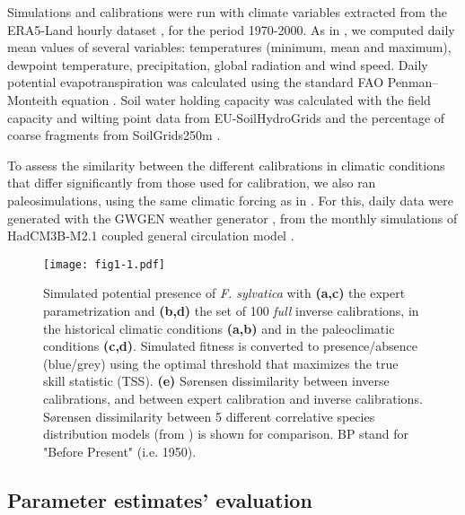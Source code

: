 \documentclass[preprint,12pt,authoryear]{elsarticle}
\begin{document}
Simulations and calibrations were run with climate variables extracted from the ERA5-Land hourly dataset \citep{MunozSabater2021}, for the period 1970-2000. As in \citet{VanderMeersch2023}, we computed daily mean values of several variables: temperatures (minimum, mean and maximum), dewpoint temperature, precipitation, global radiation and wind speed. Daily potential evapotranspiration was calculated using the standard FAO Penman–Monteith equation \citep{Allen1998}. Soil water holding capacity was calculated with the field capacity and wilting point data from EU-SoilHydroGrids \citep{Toth2017} and the percentage of coarse fragments from SoilGrids250m \citep{Hengl2017}.

To assess the similarity between the different calibrations in climatic conditions that differ significantly from those used for calibration, we also ran paleosimulations, using the same climatic forcing as in \citet{VanderMeersch2024}. For this, daily data were generated with the GWGEN \textcolor{customred}{weather} generator \citep{Sommer2017}, from the monthly simulations of HadCM3B-M2.1 coupled general circulation model \citep{Armstrong2019}.

\begin{figure}
\begin{subcaptiongroup}
\label{fig:1A} 
\label{fig:1B}
\label{fig:1C}
\label{fig:1D}
\label{fig:1E}
\end{subcaptiongroup}
\centerline{\texttt{[image: fig1-1.pdf]}}
\caption{Simulated potential presence of \emph{F. sylvatica} with \textbf{(a,c)} the expert parametrization and \textbf{(b,d)} the set of 100 \emph{full} inverse calibrations, in the historical climatic conditions \textbf{(a,b)} and in the paleoclimatic conditions \textbf{(c,d)}. Simulated fitness is converted to presence/absence (blue/grey) using the optimal threshold that maximizes the true skill statistic (TSS). \textbf{(e)} S\o rensen dissimilarity between inverse calibrations, and between expert calibration and inverse calibrations. S\o rensen dissimilarity between 5 different correlative species distribution models (from \citealp{VanderMeersch2024}) is shown for comparison. BP stand for "Before Present" (i.e. 1950).}
\label{fig:1}
\end{figure}

\subsection{Parameter estimates' evaluation}
\end{document}
